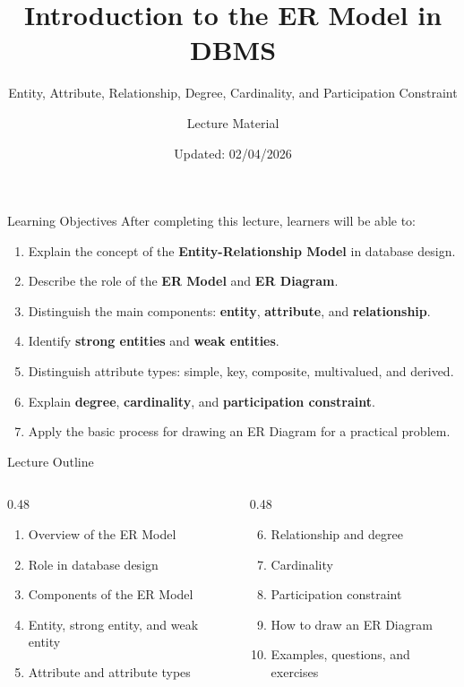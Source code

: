 \documentclass[aspectratio=169,11pt]{beamer}
\title[ER Model in DBMS]{Introduction to the ER Model in DBMS}
\subtitle{Entity, Attribute, Relationship, Degree, Cardinality, and Participation Constraint}
\author{Lecture Material}
\institute{Course: Databases}
\date{Updated: 02/04/2026}
\newcommand{\keyword}[1]{\textcolor{accent}{\textbf{#1}}}
\newcommand{\kw}[1]{\keyword{#1}}
\newcommand{\smallitem}{\setlength{\itemsep}{2pt}\setlength{\parskip}{0pt}}
\begin{document}
\begin{frame}
  \titlepage
\end{frame}

\begin{frame}{Learning Objectives}
\small
After completing this lecture, learners will be able to:
\begin{enumerate}
\smallitem
  \item Explain the concept of the \kw{Entity-Relationship Model} in database design.
  \item Describe the role of the \kw{ER Model} and \kw{ER Diagram}.
  \item Distinguish the main components: \kw{entity}, \kw{attribute}, and \kw{relationship}.
  \item Identify \kw{strong entities} and \kw{weak entities}.
  \item Distinguish attribute types: simple, key, composite, multivalued, and derived.
  \item Explain \kw{degree}, \kw{cardinality}, and \kw{participation constraint}.
  \item Apply the basic process for drawing an ER Diagram for a practical problem.
\end{enumerate}
\end{frame}

\begin{frame}{Lecture Outline}
\small
\begin{columns}[T]
\begin{column}{0.48\textwidth}
\begin{enumerate}
\smallitem
  \item Overview of the ER Model
  \item Role in database design
  \item Components of the ER Model
  \item Entity, strong entity, and weak entity
  \item Attribute and attribute types
\end{enumerate}
\end{column}
\begin{column}{0.48\textwidth}
\begin{enumerate}
\setcounter{enumi}{5}
\smallitem
  \item Relationship and degree
  \item Cardinality
  \item Participation constraint
  \item How to draw an ER Diagram
  \item Examples, questions, and exercises
\end{enumerate}
\end{column}
\end{columns}
\end{frame}
\end{document}
